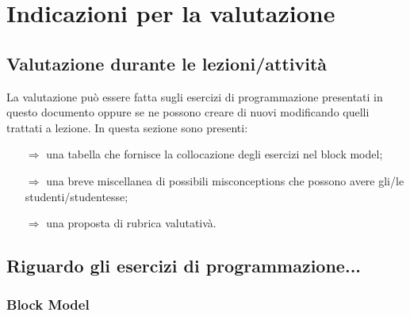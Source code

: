 \chapter{Indicazioni per la valutazione}

\section{Valutazione durante le lezioni/attività}

La valutazione può essere fatta sugli esercizi di programmazione presentati
in questo documento oppure se ne possono creare di nuovi modificando quelli
trattati a lezione. In questa sezione sono presenti:
\begin{itemize}
    \item [$\Rightarrow$] una tabella che fornisce la collocazione degli esercizi nel block model;
    \item [$\Rightarrow$] una breve miscellanea di possibili misconceptions che possono avere gli/le studenti/studentesse;
    \item [$\Rightarrow$] una proposta di rubrica valutativà.
\end{itemize}

\section{Riguardo gli esercizi di programmazione...}

\subsection{Block Model}



